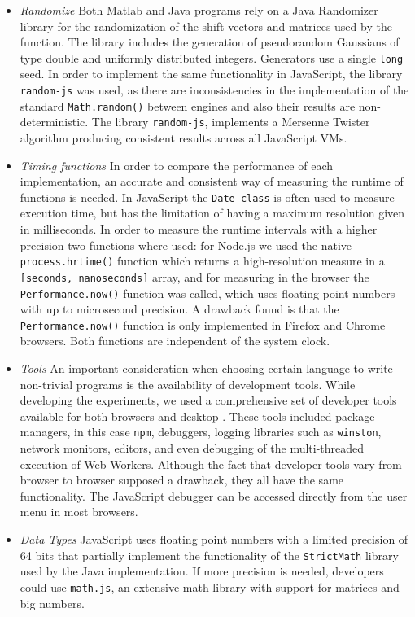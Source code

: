 \documentclass[journal,onecolumn]{IEEEtran}
\begin{document}
\begin{itemize}
\item {\em Randomize} Both Matlab and Java programs rely on a 
Java Randomizer library for the 
randomization of the shift vectors and matrices used by the function.
The library includes the generation of pseudorandom Gaussians of type
double and uniformly distributed integers. Generators use a single
{\tt long} seed. In order to implement the same functionality in
JavaScript, the library {\tt random-js} was used, as there are inconsistencies 
in the implementation of the standard {\tt Math.random()} between engines
and also their results are non-deterministic. 
The library {\tt random-js}, implements a Mersenne Twister algorithm producing 
consistent results across all JavaScript VMs.
\item {\em Timing functions} In order to compare the performance of 
each implementation, an accurate and consistent way of measuring 
the runtime of functions is needed.
In JavaScript the {\tt Date class} is often used 
to measure execution time, but has the limitation of having a maximum 
resolution given in milliseconds.
In order to measure the runtime intervals with a higher precision two functions
where used: for Node.js we used the native {\tt process.hrtime()} function
which returns a high-resolution measure in a {\tt [seconds, nanoseconds]}
array, and for measuring in the browser the {\tt Performance.now()} function was called,
which uses floating-point numbers with up to microsecond precision. 
A drawback found is that the {\tt Performance.now()} function is only implemented
in Firefox and Chrome browsers. Both functions are independent of the system clock. 
\item {\em Tools} An important consideration when choosing certain 
language to write non-trivial programs is the availability of development tools. While developing
the experiments, we used a comprehensive set of developer tools available for both
browsers and desktop \cite{tilkov2010node}. These tools included
package managers, in this case {\tt npm}, debuggers, logging libraries
such as {\tt winston}, 
network monitors, editors, and even debugging of the multi-threaded execution of Web Workers.
Although the fact that developer tools vary from browser to browser
supposed a drawback, they all have the same functionality. The
JavaScript debugger can be accessed directly from the user menu in
most browsers. 
\item {\em Data Types} JavaScript uses floating point numbers with a 
limited precision of 64 bits that partially implement the functionality of
the {\tt StrictMath} library used by the Java implementation. If more precision
is needed, developers could use {\tt math.js}, an extensive math library with
support for matrices and big numbers.
\end{itemize}
\end{document}
